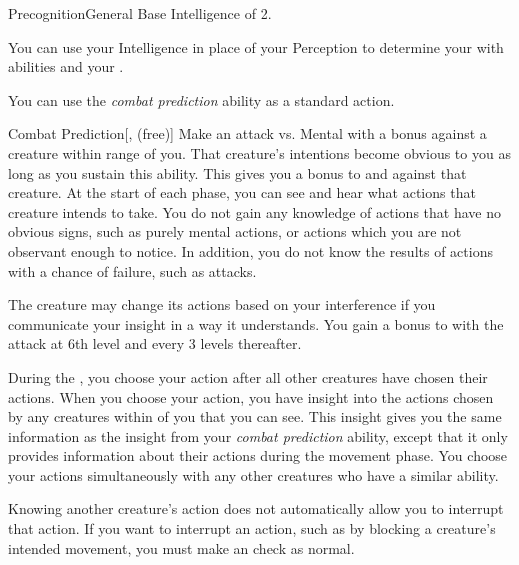     \begin{feat}{Precognition}{General}
        \featpre Base Intelligence of 2.

         You can use your Intelligence in place of your Perception to determine your  with  abilities and your .

         You can use the \textit{combat prediction} ability as a standard action.
        \begin{freeability}{Combat Prediction}[,  (free)]
            Make an attack vs. Mental with a   bonus against a creature within \rngmed range of you.
            \hit That creature's intentions become obvious to you as long as you sustain this ability.
            This gives you a  bonus to  and  against that creature.
            At the start of each phase, you can see and hear what actions that creature intends to take.
            You do not gain any knowledge of actions that have no obvious signs, such as purely mental actions, or actions which you are not observant enough to notice.
            In addition, you do not know the results of actions with a chance of failure, such as attacks.

            The creature may change its actions based on your interference if you communicate your insight in a way it understands.
            \rankline
            You gain a  bonus to  with the attack at 6th level and every 3 levels thereafter.
        \end{freeability}

         During the , you choose your action after all other creatures have chosen their actions.
        When you choose your action, you have insight into the actions chosen by any creatures within \shortrange of you that you can see.
        This insight gives you the same information as the insight from your \textit{combat prediction} ability, except that it only provides information about their actions during the movement phase.
        You choose your actions simultaneously with any other creatures who have a similar ability.

        Knowing another creature's action does not automatically allow you to interrupt that action.
        If you want to interrupt an action, such as by blocking a creature's intended movement, you must make an  check as normal.


\end{feat}
